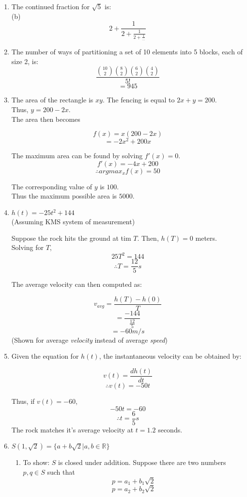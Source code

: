 \documentclass[a4paper,12pt]{article} %
\begin{document}
\begin{enumerate}
  \item The continued fraction for $\sqrt{5}$ is:\\
      (b) $$ 2 + \frac{1}{2 + \frac{1}{2 + \frac{1}{\ldots}}}$$
  \item The number of ways of partitioning a set of 10 elements into 5 blocks, each of size 2, is:
    $$ \frac{\binom{10}{2}\binom{8}{2}\binom{6}{2}\binom{4}{2}}{5!}$$
    $$ = 945 $$
  \item The area of the rectangle is $xy$. The fencing is equal to $2x + y = 200$.\\
    Thus, $y = 200 - 2x$.\\
    The area then becomes

    $$ f(x) = x(200 - 2x) $$
    $$      = -2x^2 + 200x $$

    The maximum area can be found by solving $f'(x) = 0$.\\
    $$ f'(x) = -4x + 200 $$
    $$ \therefore argmax_{x}f(x) = 50 $$

    The corresponding value of $y$ is $100$.\\
    Thus the maximum possible area is $5000$.
  \item $h(t) = -25t^2 + 144$\\

    (Assuming KMS system of measurement)

    Suppose the rock hits the ground at tim $T$. Then, $h(T) = 0$ meters.\\
    Solving for $T$,\\
    $$ 25T^2 = 144$$
    $$ \therefore T = \frac{12}{5} s$$

    The average velocity can then computed as:

    $$ v_{avg} = \frac{h(T) - h(0)}{T} $$
    $$         = \frac{-144}{\frac{12}{5}} $$
    $$         = -60 m/s$$
    (Shown for average \textit{velocity} instead of average \textit{speed})
  \item Given the equation for $h(t)$, the instantaneous velocity can be obtained by:

    $$ v(t) = \frac{dh(t)}{dt} $$
    $$ \therefore v(t)      = -50t $$

    Thus, if $v(t) = -60$,
    $$ -50t = -60 $$
    $$ \therefore t = \frac{6}{5} s$$
    The rock matches it's average velocity at $t = 1.2$ seconds.
  \item $S(1, \sqrt{2}) = \{a + b\sqrt{2}|a, b \in \mathbb{R}\}$
    \begin{enumerate}
      \item To show: $S$ is closed under addition.
        Suppose there are two numbers $p, q \in S$ such that
        $$p = a_1 + b_1\sqrt{2}$$
        $$p = a_2 + b_2\sqrt{2}$$


\end{enumerate}
\end{enumerate}
\end{document}
